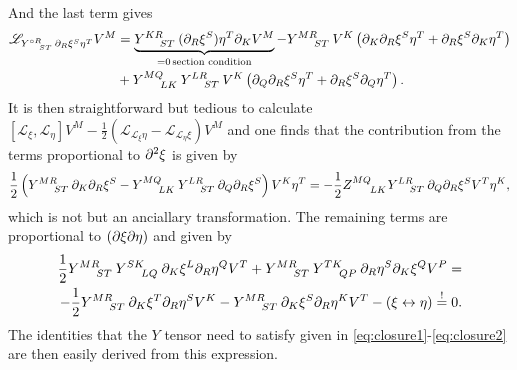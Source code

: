 And the last term gives 
\begin{equation}
    \begin{aligned}
        \mathscr{L}_{\tensor{Y}{^{\circ R}_{ST}}\pd_R\xi^S\eta^T}V^M &= \underbrace{\tensor{Y}{^{KR}_{ST}}(\pd_R\xi^S)\eta^T\pd_KV^M}_{=0\, \text{section condition}}-\tensor{Y}{^{MR}_{ST}}V^K\left(\pd_K\pd_R\xi^S\eta^T+\pd_R\xi^S\pd_K\eta^T\right)\\
        &+\tensor{Y}{^{MQ}_{LK}}\tensor{Y}{^{LR}_{ST}}V^K\left(\pd_Q\pd_R\xi^S\eta^T+\pd_R\xi^S\pd_Q\eta^T\right).
    \end{aligned}
\end{equation}
It is then straightforward but tedious to calculate $[\mathscr{L}_\xi,\mathscr{L}_\eta] V^M-\frac{1}{2}(\mathscr{L}_{\mathscr{L}_\xi\eta}-\mathscr{L}_{\mathscr{L}_\eta\xi})V^M$ and one finds that the contribution from the terms proportional to $\partial^2\xi$ is given by
\begin{equation}
    \frac{1}{2}\left(\tensor{Y}{^{MR}_{ST}}\pd_K\pd_R\xi^S-\tensor{Y}{^{MQ}_{LK}}\tensor{Y}{^{LR}_{ST}}\pd_Q\pd_R\xi^S\right)V^K\eta^T = -\frac{1}{2}\tensor{Z}{^{MQ}_{LK}}\tensor{Y}{^{LR}_{ST}}\pd_Q\pd_R\xi^SV^T\eta^K,
\end{equation}
which is not but an anciallary transformation. The remaining terms are proportional to $(\partial\xi\partial\eta)$ and given by 
\begin{equation}
    \begin{aligned}
        \frac{1}{2}\tensor{Y}{^{MR}_{ST}}\tensor{Y}{^{SK}_{LQ}}\pd_K\xi^L\pd_R\eta^QV^T+\tensor{Y}{^{MR}_{ST}}\tensor{Y}{^{TK}_{QP}}\pd_R\eta^S\pd_K\xi^QV^P=\\
        -\frac{1}{2}\tensor{Y}{^{MR}_{ST}}\pd_K\xi^T\pd_R\eta^SV^K-\tensor{Y}{^{MR}_{ST}}\pd_K\xi^S\pd_R\eta^KV^T-(\xi\leftrightarrow\eta) \overset{!}{=}0.
    \end{aligned}
\end{equation}
The identities that the $Y$ tensor need to satisfy given in \eqref{eq:closure1}-\eqref{eq:closure2} are then easily derived from this expression. 

